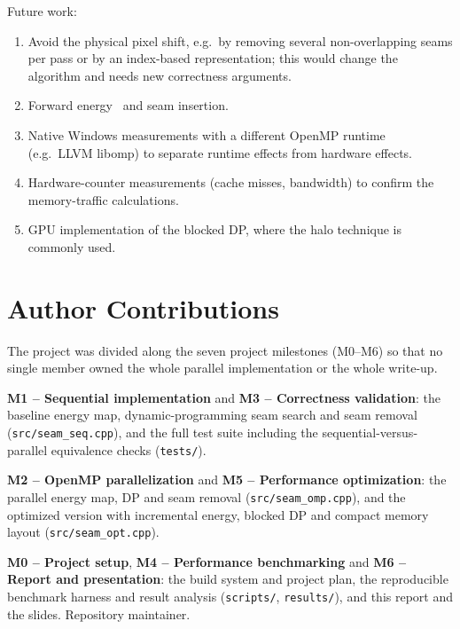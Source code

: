 \documentclass[11pt,a4paper]{article}
\begin{document}
Future work:
\begin{enumerate}
  \item Avoid the physical pixel shift, e.g.\ by removing several non-overlapping seams per pass or by an
    index-based representation; this would change the algorithm and needs new correctness arguments.
  \item Forward energy~\cite{rubinstein2008} and seam insertion.
  \item Native Windows measurements with a different OpenMP runtime (e.g.\ LLVM libomp) to separate runtime
    effects from hardware effects.
  \item Hardware-counter measurements (cache misses, bandwidth) to confirm the memory-traffic calculations.
  \item GPU implementation of the blocked DP, where the halo technique is commonly used.
\end{enumerate}

\section*{Author Contributions}

The project was divided along the seven project milestones (M0--M6) so that no single member
owned the whole parallel implementation or the whole write-up.

\begin{description}[leftmargin=2.2cm, style=nextline, itemsep=4pt]
  \item[Đỗ Tùng Dương] \textbf{M1 -- Sequential implementation} and \textbf{M3 -- Correctness
    validation}: the baseline energy map, dynamic-programming seam search and seam removal
    (\texttt{src/seam\_seq.cpp}), and the full test suite including the sequential-versus-parallel
    equivalence checks (\texttt{tests/}).
  \item[Hoàng Trọng Đại] \textbf{M2 -- OpenMP parallelization} and \textbf{M5 -- Performance
    optimization}: the parallel energy map, DP and seam removal (\texttt{src/seam\_omp.cpp}), and the
    optimized version with incremental energy, blocked DP and compact memory layout
    (\texttt{src/seam\_opt.cpp}).
  \item[Lê Quang Huy] \textbf{M0 -- Project setup}, \textbf{M4 -- Performance benchmarking} and
    \textbf{M6 -- Report and presentation}: the build system and project plan, the reproducible
    benchmark harness and result analysis (\texttt{scripts/}, \texttt{results/}), and this report and
    the slides. Repository maintainer.
\end{description}
\end{document}
